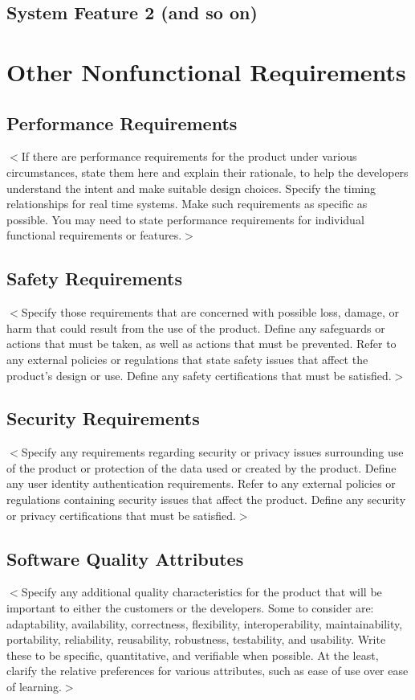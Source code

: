 \documentclass{scrreprt}
\begin{document}
\section{System Feature 2 (and so on)}


\chapter{Other Nonfunctional Requirements}

\section{Performance Requirements}

$<$If there are performance requirements for the product under various 
circumstances, state them here and explain their rationale, to help the 
developers understand the intent and make suitable design choices. Specify the 
timing relationships for real time systems. Make such requirements as specific 
as possible. You may need to state performance requirements for individual 
functional requirements or features.$>$

\section{Safety Requirements}
$<$Specify those requirements that are concerned with possible loss, damage, or 
harm that could result from the use of the product. Define any safeguards or 
actions that must be taken, as well as actions that must be prevented. Refer to 
any external policies or regulations that state safety issues that affect the 
product’s design or use. Define any safety certifications that must be 
satisfied.$>$

\section{Security Requirements}
$<$Specify any requirements regarding security or privacy issues surrounding use 
of the product or protection of the data used or created by the product. Define 
any user identity authentication requirements. Refer to any external policies or 
regulations containing security issues that affect the product. Define any 
security or privacy certifications that must be satisfied.$>$

\section{Software Quality Attributes}
$<$Specify any additional quality characteristics for the product that will be 
important to either the customers or the developers. Some to consider are: 
adaptability, availability, correctness, flexibility, interoperability, 
maintainability, portability, reliability, reusability, robustness, testability, 
and usability. Write these to be specific, quantitative, and verifiable when 
possible. At the least, clarify the relative preferences for various attributes, 
such as ease of use over ease of learning.$>$
\end{document}
